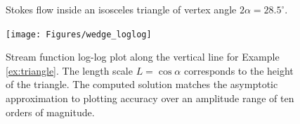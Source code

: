 \documentclass{article}
\begin{document}
\begin{example}
\begin{figure}[H]
	\caption{Stokes flow inside an isosceles triangle of vertex angle $2\alpha=28.5^\circ$.}
	\label{fig:wedge}
\end{figure} 
\begin{figure}[H]
	\centering
	\texttt{[image: Figures/wedge\_loglog]}
   \caption{Stream function log-log plot along the vertical line for Example
   \ref{ex:triangle}. The length scale $L=\cos{\alpha}$ corresponds to the
   height of the triangle. The computed solution matches the asymptotic
   approximation to plotting accuracy over an amplitude range of ten orders of
   magnitude.}
	\label{fig:wedge_loglog}
\end{figure}
\end{example}
\end{document}
